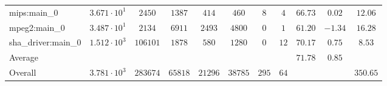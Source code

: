 \begin{tabular}{|l|c|c|c|c|c|c|c|c|c|c|}
mips:main\_0            & $ 3.671 \cdot 10^{1} $ & $ 2450   $ & $ 1387  $ & $ 414   $ & $ 460   $ & $ 8   $ & $ 4  $ & $ 66.73       $ & $ 0.02    $ & $ 12.06   $ \\
mpeg2:main\_0           & $ 3.487 \cdot 10^{1} $ & $ 2134   $ & $ 6911  $ & $ 2493  $ & $ 4800  $ & $ 0   $ & $ 1  $ & $ 61.20       $ & $ -1.34   $ & $ 16.28   $ \\
sha\_driver:main\_0     & $ 1.512 \cdot 10^{3} $ & $ 106101 $ & $ 1878  $ & $ 580   $ & $ 1280  $ & $ 0   $ & $ 12 $ & $ 70.17       $ & $ 0.75    $ & $ 8.53    $ \\
\hline
Average                 & $                    $ & $        $ & $       $ & $       $ & $       $ & $     $ & $    $ & $ 71.78       $ & $ 0.85    $ & $         $ \\
\hline
Overall                 & $ 3.781 \cdot 10^{3} $ & $ 283674 $ & $ 65818 $ & $ 21296 $ & $ 38785 $ & $ 295 $ & $ 64 $ & $             $ & $         $ & $ 350.65  $ \\
\hline
\end{tabular}
